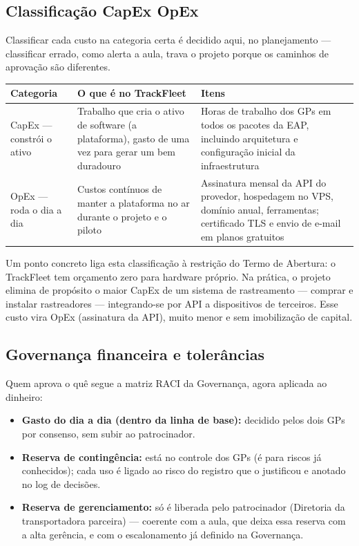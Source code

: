 \documentclass[11pt,a4paper]{article}
\begin{document}
\subsection{Classificação CapEx {\texttimes} OpEx}
Classificar cada custo na categoria certa é decidido aqui, no planejamento --- classificar errado, como alerta a aula, trava o projeto porque os caminhos de aprovação são diferentes.

\begin{center}
\begin{tabularx}{\textwidth}{l L L}
\toprule
\textbf{Categoria} & \textbf{O que é no TrackFleet} & \textbf{Itens} \\
\midrule
CapEx --- constrói o ativo & Trabalho que cria o ativo de software (a plataforma), gasto de uma vez para gerar um bem duradouro & Horas de trabalho dos GPs em todos os pacotes da EAP, incluindo arquitetura e configuração inicial da infraestrutura \\
OpEx --- roda o dia a dia & Custos contínuos de manter a plataforma no ar durante o projeto e o piloto & Assinatura mensal da API do provedor, hospedagem no VPS, domínio anual, ferramentas; certificado TLS e envio de e-mail em planos gratuitos \\
\bottomrule
\end{tabularx}
\end{center}

\noindent Um ponto concreto liga esta classificação à restrição do Termo de Abertura: o TrackFleet tem orçamento zero para hardware próprio. Na prática, o projeto elimina de propósito o maior CapEx de um sistema de rastreamento --- comprar e instalar rastreadores --- integrando-se por API a dispositivos de terceiros. Esse custo vira OpEx (assinatura da API), muito menor e sem imobilização de capital.

\subsection{Governança financeira e tolerâncias}\label{fin:tolerancias}
Quem aprova o quê segue a matriz RACI da Governança, agora aplicada ao dinheiro:
\begin{itemize}[itemsep=3pt]
  \item \textbf{Gasto do dia a dia (dentro da linha de base):} decidido pelos dois GPs por consenso, sem subir ao patrocinador.
  \item \textbf{Reserva de contingência:} está no controle dos GPs (é para riscos já conhecidos); cada uso é ligado ao risco do registro que o justificou e anotado no log de decisões.
  \item \textbf{Reserva de gerenciamento:} só é liberada pelo patrocinador (Diretoria da transportadora parceira) --- coerente com a aula, que deixa essa reserva com a alta gerência, e com o escalonamento já definido na Governança.
\end{itemize}
\end{document}
